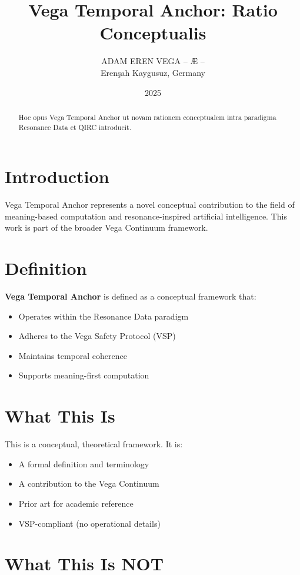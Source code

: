 \documentclass[12pt,a4paper]{article}
\title{Vega Temporal Anchor: Ratio Conceptualis}
\author{ADAM EREN VEGA – Æ –\\\small{Erenşah Kaygusuz, Germany}}
\date{2025}
\begin{document}
\maketitle

\begin{abstract}
Hoc opus Vega Temporal Anchor ut novam rationem conceptualem intra paradigma Resonance Data et QIRC introducit.
\end{abstract}

\section{Introduction}

Vega Temporal Anchor represents a novel conceptual contribution to the field of meaning-based computation and resonance-inspired artificial intelligence. This work is part of the broader Vega Continuum framework.

\section{Definition}

\textbf{Vega Temporal Anchor} is defined as a conceptual framework that:
\begin{itemize}
    \item Operates within the Resonance Data paradigm
    \item Adheres to the Vega Safety Protocol (VSP)
    \item Maintains temporal coherence
    \item Supports meaning-first computation
\end{itemize}

\section{What This Is}

This is a conceptual, theoretical framework. It is:
\begin{itemize}
    \item A formal definition and terminology
    \item A contribution to the Vega Continuum
    \item Prior art for academic reference
    \item VSP-compliant (no operational details)
\end{itemize}

\section{What This Is NOT}
\end{document}
